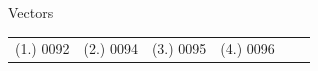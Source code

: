 \begin{eocexercises}{Vectors}
\begin{enumerate}[noitemsep, label=\textbf{\arabic*}.]
\end{enumerate}
  \label{m38819**end}
  \label{59e414b70efc194a27a122db47d06ce6**end}
\par \practiceinfo
 \par \begin{tabular}[h]{cccccc}
 (1.) 0092  &  
(2.) 0094  &  
(3.) 0095  &  
(4.) 0096  &  
\end{tabular}
\end{eocexercises}
